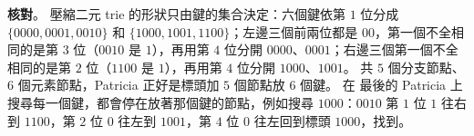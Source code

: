 \begin{pastsoln}
\textbf{核對}。 壓縮二元 trie 的形狀只由鍵的集合決定：六個鍵依第 $1$ 位分成 $\{0000, 0001, 0010\}$ 和
$\{1000, 1001, 1100\}$；左邊三個前兩位都是 $00$，第一個不全相同的是第 $3$ 位（$0010$ 是 $1$），再用第
$4$ 位分開 $0000$、$0001$；右邊三個第一個不全相同的是第 $2$ 位（$1100$ 是 $1$），再用第 $4$ 位分開
$1000$、$1001$。 共 $5$ 個分支節點、$6$ 個元素節點，Patricia 正好是標頭加 $5$ 個節點放 $6$ 個鍵。 在
最後的 Patricia 上搜尋每一個鍵，都會停在放著那個鍵的節點，例如搜尋 $1000$：$0010$ 第 $1$ 位 $1$ 往右到
$1100$，第 $2$ 位 $0$ 往左到 $1001$，第 $4$ 位 $0$ 往左回到標頭 $1000$，找到。
\end{pastsoln}
